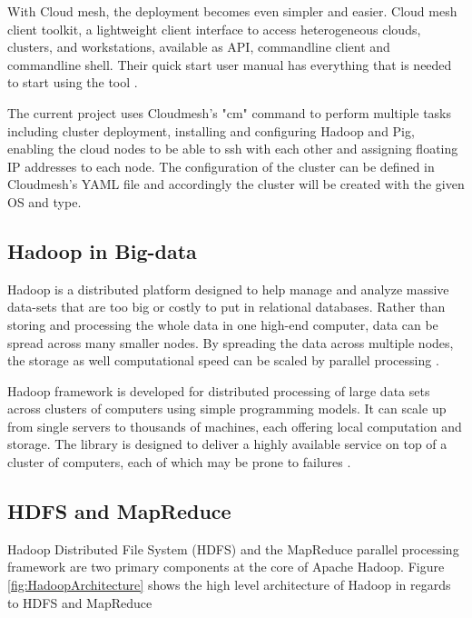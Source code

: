 \documentclass[9pt,twocolumn,twoside]{../../styles/osajnl}
\begin{document}
With Cloud mesh, the deployment becomes even simpler and easier. Cloud mesh client toolkit, a lightweight client interface to access heterogeneous clouds, clusters, and workstations, available as API, commandline client and commandline shell. Their quick start user manual has everything that is needed to start using the tool \cite{www-cm-docs}.

The current project uses Cloudmesh's "cm" command to perform multiple tasks including cluster deployment, installing and configuring Hadoop and Pig, enabling the cloud nodes to be able to ssh with each other and assigning floating IP addresses to each node. The configuration of the cluster can be defined in Cloudmesh's YAML file and accordingly the cluster will be created with the given OS and type.

\subsection{Hadoop in Big-data}
Hadoop is a distributed platform designed to help manage and analyze massive data-sets that are too big or costly to put in relational databases. Rather than storing and processing the whole data in one high-end computer, data can be spread across many smaller nodes. By spreading the data across multiple nodes, the storage as well computational speed can be scaled by parallel processing \cite{www-thinkbig}.

Hadoop framework is developed for distributed processing of large data sets across clusters of computers using simple programming models. It can scale up from single servers to thousands of machines, each offering local computation and storage. The library is designed to deliver a highly available service on top of a cluster of computers, each of which may be prone to failures \cite{www-readwrite}.

\subsection{HDFS and MapReduce}
Hadoop Distributed File System (HDFS) and the MapReduce parallel processing framework are two primary components at the core of Apache Hadoop. Figure \ref{fig:HadoopArchitecture} shows the high level architecture of Hadoop in regards to HDFS and MapReduce 
\end{document}
